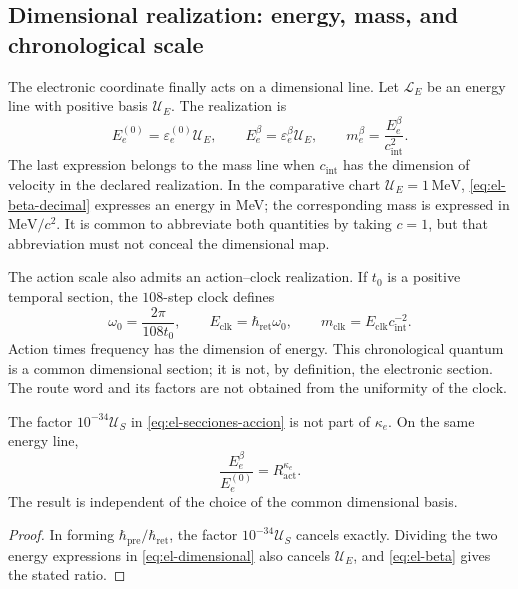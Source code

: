 \subsection{Dimensional realization: energy, mass, and chronological scale}

The electronic coordinate finally acts on a dimensional line.
Let \(\mathcal L_E\) be an energy line with positive basis
\(\mathcal U_E\). The realization is
\begin{equation}
 E_e^{(0)}=\varepsilon_e^{(0)}\mathcal U_E,\qquad
 E_e^\beta=\varepsilon_e^\beta\mathcal U_E,
 \qquad m_e^\beta=\frac{E_e^\beta}{c_{\mathrm{int}}^2}.
 \label{eq:el-dimensional}
\end{equation}
The last expression belongs to the mass line when
\(c_{\mathrm{int}}\) has the dimension of velocity in the declared
realization. In the comparative chart \(\mathcal U_E=1\,\mathrm{MeV}\),
\eqref{eq:el-beta-decimal} expresses an energy in MeV; the corresponding
mass is expressed in \(\mathrm{MeV}/c^2\). It is common
to abbreviate both quantities by taking \(c=1\), but that abbreviation must
not conceal the dimensional map.

The action scale also admits an action--clock realization. If
\(t_0\) is a positive temporal section, the \(108\)-step clock
defines
\begin{equation}
 \omega_0=\frac{2\pi}{108t_0},\qquad
 E_{\mathrm{clk}}=\hbar_{\mathrm{ret}}\omega_0,\qquad
 m_{\mathrm{clk}}=E_{\mathrm{clk}}c_{\mathrm{int}}^{-2}.
 \label{eq:el-cuanto-reloj}
\end{equation}
Action times frequency has the dimension of energy. This chronological
quantum is a common dimensional section; it is not, by definition,
the electronic section. The route word and its factors are not
obtained from the uniformity of the clock.

\begin{proposition}
The factor \(10^{-34}\mathcal U_S\) in
\eqref{eq:el-secciones-accion} is not part of \(\kappa_e\). On
the same energy line,
\begin{equation}
 \frac{E_e^\beta}{E_e^{(0)}}=R_{\mathrm{act}}^{\kappa_e}.
 \label{eq:el-razon-energia}
\end{equation}
The result is independent of the choice of the common dimensional
basis.
\end{proposition}
\begin{proof}
In forming \(\hbar_{\mathrm{pre}}/\hbar_{\mathrm{ret}}\), the factor
\(10^{-34}\mathcal U_S\) cancels exactly. Dividing the two
energy expressions in \eqref{eq:el-dimensional} also cancels
\(\mathcal U_E\), and \eqref{eq:el-beta} gives the stated ratio.
\end{proof}

